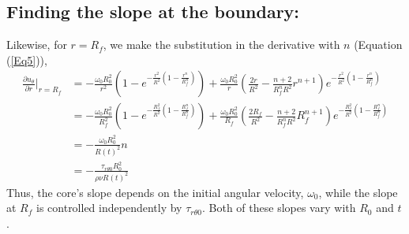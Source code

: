 \documentclass{article}
\begin{document}
\subsection{Finding the slope at the boundary:}
Likewise, for $r=R_f$, we make the substitution in the derivative with $n$ (Equation (\ref{Eq5})),
\begin{align*}
    \frac{\partial u_\theta}{\partial r}|_{r=R_f} &= -\frac{\omega_0 R_0^2}{r^2}\left ( 1-e^{-\frac{r^2}{R^2}\left ( 1-\frac{r^n}{R_f^n} \right)} \right ) + \frac{\omega_0 R_0^2}{r}\left ( \frac{2r}{R^2}- \frac{n+2}{R_f^n R^2}r^{n+1} \right )e^{-\frac{r^2}{R^2}\left ( 1-\frac{r^n}{R_f^n} \right)} \\
    &= -\frac{\omega_0 R_0^2}{R_f^2}\left ( 1-e^{-\frac{R_f^2}{R^2}\left ( 1-\frac{R_f^n}{R_f^n} \right)} \right ) + \frac{\omega_0 R_0^2}{R_f}\left ( \frac{2R_f}{R^2}- \frac{n+2}{R_f^n R^2}R_f^{n+1} \right )e^{-\frac{R_f^2}{R^2}\left ( 1-\frac{R_f^n}{R_f^n} \right)} \\
    &=-\frac{\omega_0 R_0^2}{R(t)^2}n \\
    &= - \frac{\tau_{r \theta 0} R_0^2}{\rho \nu R(t)^2}
\end{align*}
Thus, the core's slope depends on the initial angular velocity, $\omega_0$, while the slope at $R_f$ is controlled independently by $\tau_{r\theta 0}$. Both of these slopes vary with $R_0$ and $t$. 
\end{document}
